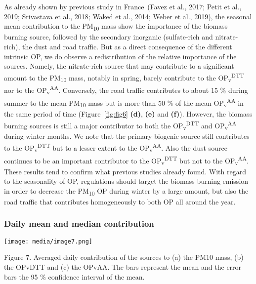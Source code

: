 \documentclass[
]{article}
\begin{document}
As already shown by previous study in France~(Favez et al., 2017; Petit
et al., 2019; Srivastava et al., 2018; Waked et al., 2014; Weber et al.,
2019), the seasonal mean contribution to the PM\textsubscript{10} mass
show the importance of the biomass burning source, followed by the
secondary inorganic (sulfate-rich and nitrate-rich), the dust and road
traffic. But as a direct consequence of the different intrinsic OP, we
do observe a redistribution of the relative importance of the sources.
Namely, the nitrate-rich source that may contribute to a significant
amount to the PM\textsubscript{10} mass, notably in spring, barely
contribute to the OP\textsubscript{v}\textsuperscript{DTT} nor to the
OP\textsubscript{v}\textsuperscript{AA}. Conversely, the road traffic
contributes to about 15 \% during summer to the mean
PM\textsubscript{10} mass but is more than 50 \% of the mean
OP\textsubscript{v}\textsuperscript{AA} in the same period of time
(Figure~\protect\hyperlink{fig:fig6}{{[}fig:fig6{]}} \textbf{(d)},
\textbf{(e)} and \textbf{(f)}). However, the biomass burning sources is
still a major contributor to both the
OP\textsubscript{v}\textsuperscript{DTT} and
OP\textsubscript{v}\textsuperscript{AA} during winter months. We note
that the primary biogenic source still contributes to the
OP\textsubscript{v}\textsuperscript{DTT} but to a lesser extent to the
OP\textsubscript{v}\textsuperscript{AA}. Also the dust source continues
to be an important contributor to the
OP\textsubscript{v}\textsuperscript{DTT} but not to the
OP\textsubscript{v}\textsuperscript{AA}. These results tend to confirm
what previous studies already found. With regard to the seasonality of
OP, regulations should target the biomass burning emission in order to
decrease the PM\textsubscript{10} OP during winter by a large amount,
but also the road traffic that contributes homogeneously to both OP all
around the year.

\hypertarget{daily-mean-and-median-contribution}{%
\subsubsection{Daily mean and median
contribution}\label{daily-mean-and-median-contribution}}

\texttt{[image: media/image7.png]}

Figure 7. Averaged daily contribution of the sources to (a) the PM10
mass, (b) the OPvDTT and (c) the OPvAA. The bars represent the mean and
the error bars the 95 \% confidence interval of the mean.
\end{document}
